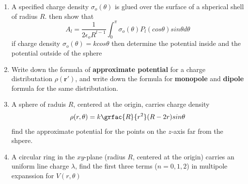 \documentclass{bookq}[12pt, a4paper]
\newcommand{\gfrac}[2]{\frac{\displaystyle #1}{\displaystyle #2}}
\begin{document}
\begin{enumerate}
\item A specified charge density $\sigma_o(\theta)$ is glued over the surface of a shperical shell  of radius $R$.
then show that
$$
A_l = \gfrac{1}{2\epsilon_o R^{l - 1}} \int_0^{\pi} \sigma_o(\theta) P_l(cos\theta)sin\theta d\theta
$$
if charge density $\sigma_o(\theta) = kcos\theta$ then determine the potential inside and the potential outside of the sphere

\item Write down the formula of \textbf{approximate potential} for a charge distributation $\rho(\mathbf{r'})$,
and write down the formula for \textbf{monopole} and \textbf{dipole} formula for the same distributation.

\item A sphere of raduis $R$, centered at the origin, carries charge density
$$\rho(r, \theta) = k\grfac{R}{r^2}(R - 2r)sin\theta$$ find the approximate potential for the points on the $z$-axis
far from the shpere.

\item A circular ring in the $xy$-plane (radius $R$, centered at the origin) carries an uniform line charge $\lambda$, find
the first three terms ($n = 0, 1, 2$) in multipole expanssion for $V(r, \theta)$





\end{enumerate}
\end{document}
